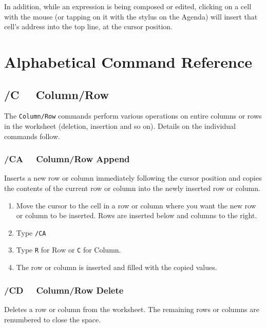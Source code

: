 \documentclass[titlepage]{article}
\begin{document}
In addition, while an expression is being composed or edited, clicking
on a cell with the mouse (or tapping on it with the stylus on the
Agenda) will insert that cell's address into the top line, at the
cursor position.

\section{Alphabetical Command Reference}
\label{sec:cmdref}

\let\usage\relax

\subsection[Column and Row Commands]{/C \ \  Column/Row}
        
The \texttt{Column/Row} commands perform various operations on entire
columns or rows in the worksheet (deletion, insertion and so on).
Details on the individual commands follow.


\subsubsection{/CA \ \  Column/Row Append}

Inserts a new row or column immediately following the cursor
position and copies the contents of the current row or column into the
newly inserted row or column.

\usage{}
\begin{enumerate}\itemsep -2pt
\item Move the cursor to the cell in a row or column where you want
  the new row or column to be inserted.  Rows are inserted below and
  columns to the right.
\item Type \texttt{/CA}
\item Type \texttt{R} for Row or \texttt{C} for Column.
\item The row or column is inserted and filled with the copied values.
\end{enumerate}

\subsubsection{/CD \ \ Column/Row Delete}
        
Deletes a row or column from the worksheet.  The remaining rows or
columns are renumbered to close the space.  
\end{document}
